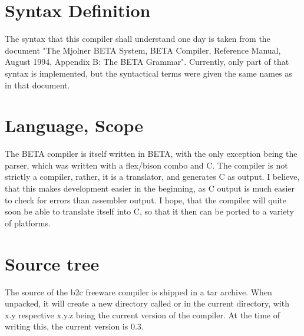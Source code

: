 \section{Syntax Definition}
The syntax that this compiler shall understand one day is taken
from the document "The Mjolner BETA System, BETA Compiler,
Reference Manual, August 1994, Appendix B: The BETA Grammar".
Currently, only part of that syntax is implemented, but the
syntactical terms were given the same names as in that document.

\section{Language, Scope}
The BETA compiler is itself written in BETA, with the only
exception being the parser, which was written with a flex/bison
combo and C.  The compiler is not strictly a compiler, rather, it
is a translator, and generates C as output.  I believe, that this
makes development easier in the beginning, as C output is much
easier to check for errors than assembler output.  I hope, that
the compiler will quite soon be able to translate itself into
C, so that it then can be ported to a variety of platforms.

\section{Source tree}
The source of the b2c freeware compiler is shipped in a tar
archive.  When unpacked, it will create a new directory called
 or  in the current directory,
with x.y respective x.y.z being the current version of the
compiler.  At the time of writing this, the current version
is 0.3.

